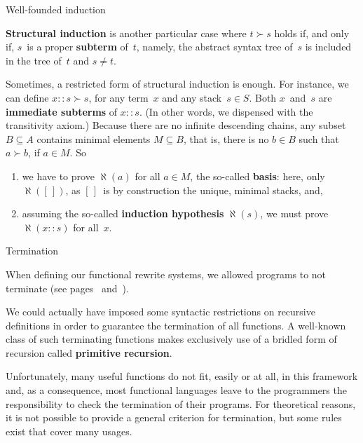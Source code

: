 \documentclass[compress,dvipdfmx]{beamer}
\newcommand\el{[\,]}
\newcommand\cons[2]{{#1}\!::\!{#2}}
\begin{document}
%
\begin{frame}{Well-founded induction}

\textbf{Structural induction} is another particular case where \(t \succ
s\) holds if, and only if, \(s\)~is a proper \textbf{subterm} of~\(t\),
namely, the abstract syntax tree of~\(s\) is included in the tree
of~\(t\) and \(s \neq t\).

\bigskip

Sometimes, a restricted form of structural induction is enough. For
instance, we can define \(\cons{x}{s} \succ s\), for any term~\(x\)
and any stack~\(s \in S\). Both \(x\)~and~\(s\) are \textbf{immediate
subterms} of \(\cons{x}{s}\). (In other words, we dispensed with the
transitivity axiom.) Because there are no infinite descending chains,
any subset \(B \subseteq A\) contains minimal elements \(M \subseteq
B\), that is, there is no \(b \in B\) such that \(a \succ b\), if \(a
\in M\). So
\begin{enumerate}

  \item we have to prove \(\aleph(a)\) for all \(a \in M\), the
    so\hyp{}called \textbf{basis}: here, only \(\aleph(\el)\), as
    \(\el\)~is by construction the unique, minimal stacks, and,

  \item assuming the so\hyp{}called \textbf{induction hypothesis}
    \(\aleph(s)\), we must prove \(\aleph(\cons{x}{s})\) for
    all~\(x\).

\end{enumerate}

\end{frame}

%
\begin{frame}{Termination}

  When defining our functional rewrite systems, we allowed programs to
  not terminate (see pages~\pageref{termination1}
  and~\pageref{termination2}).

  \bigskip

  We could actually have imposed some syntactic restrictions on
  recursive definitions in order to guarantee the termination of all
  functions. A well\hyp{}known class of such terminating functions
  makes exclusively use of a bridled form of recursion called
  \textbf{primitive recursion}.

  \bigskip

  Unfortunately, many useful functions do not fit, easily or at all,
  in this framework and, as a consequence, most functional languages
  leave to the programmers the responsibility to check the termination
  of their programs. For theoretical reasons, it is not possible to
  provide a general criterion for termination, but some rules exist
  that cover many usages.

\end{frame}
\end{document}
